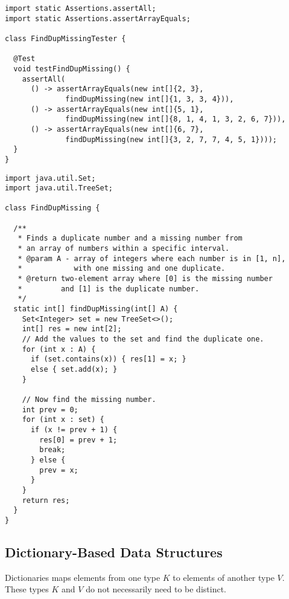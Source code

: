 

\begin{lstlisting}[language=MyJava]
import static Assertions.assertAll;
import static Assertions.assertArrayEquals;

class FindDupMissingTester {

  @Test
  void testFindDupMissing() {
    assertAll(
      () -> assertArrayEquals(new int[]{2, 3}, 
              findDupMissing(new int[]{1, 3, 3, 4})),
      () -> assertArrayEquals(new int[]{5, 1}, 
              findDupMissing(new int[]{8, 1, 4, 1, 3, 2, 6, 7})),
      () -> assertArrayEquals(new int[]{6, 7}, 
              findDupMissing(new int[]{3, 2, 7, 7, 4, 5, 1})));
  }
}
\end{lstlisting}

\begin{lstlisting}[language=MyJava]
import java.util.Set;
import java.util.TreeSet;

class FindDupMissing {

  /**
   * Finds a duplicate number and a missing number from 
   * an array of numbers within a specific interval.
   * @param A - array of integers where each number is in [1, n],
   *            with one missing and one duplicate.
   * @return two-element array where [0] is the missing number
   *         and [1] is the duplicate number.
   */
  static int[] findDupMissing(int[] A) {
    Set<Integer> set = new TreeSet<>();
    int[] res = new int[2];
    // Add the values to the set and find the duplicate one.
    for (int x : A) {
      if (set.contains(x)) { res[1] = x; } 
      else { set.add(x); }
    }

    // Now find the missing number.
    int prev = 0;
    for (int x : set) {
      if (x != prev + 1) {
        res[0] = prev + 1;
        break;
      } else {
        prev = x;
      }
    }
    return res;
  }
}
\end{lstlisting}

\subsection{Dictionary-Based Data Structures}
Dictionaries maps elements from one type $K$ to elements of another type $V$. These types $K$ and $V$ do not necessarily need to be distinct. 

